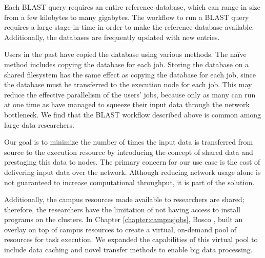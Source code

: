 Each BLAST query requires an entire reference database, which can range in size from a few kilobytes to many gigabytes.  The workflow to run a BLAST query requires a large stage-in time in order to make the reference database available.  Additionally, the databases are frequently updated with new entries.

Users in the past have copied the database using various methods.  The na\"{i}ve method includes copying the database for each job.  Storing the database on a shared filesystem has the same effect as copying the database for each job, since the database must be transferred to the execution node for each job.  This may reduce the effective parallelism of the users' jobs, because only as many can run at one time as have managed to squeeze their input data through the network bottleneck.  We find that the BLAST workflow described above is common among large data researchers.

Our goal is to minimize the number of times the input data is transferred from source to the execution resource by introducing the concept of shared data and prestaging this data to nodes.  The primary concern for our use case is the cost of delivering input data over the network.  Although reducing network usage alone is not guaranteed to increase computational throughput, it is part of the solution.







Additionally, the campus resources made available to researchers are shared; therefore, the researchers have the limitation of not having access to install programs on the clusters.  In Chapter \ref{chapter:campusjobs}, Bosco \cite{weitzel2014accessing}, built an overlay on top of campus resources to create a virtual, on-demand pool of resources for task execution.  We expanded the capabilities of this virtual pool to include data caching and novel transfer methods to enable big data processing.


